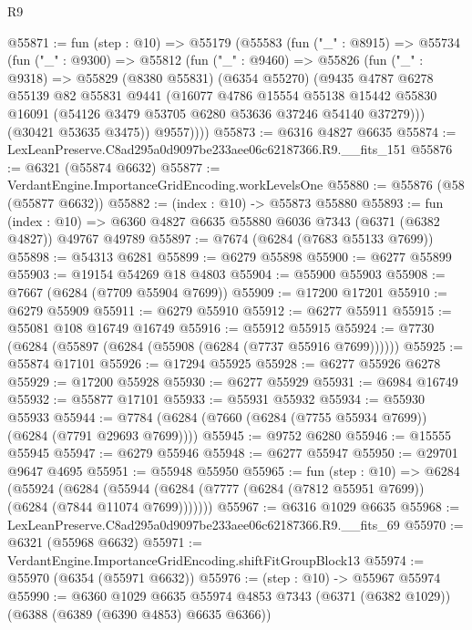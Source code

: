 \begin{lexlean}{R9}
\begin{coremodule}
@55871 := fun (step : @10) =>
  @55179
    (@55583
      (fun ("_" : @8915) =>
      @55734
        (fun ("_" : @9300) =>
        @55812
          (fun ("_" : @9460) =>
          @55826
            (fun ("_" : @9318) =>
            @55829
              (@8380 @55831)
              (@6354 @55270)
              (@9435
                @4787
                @6278
                @55139
                @82
                @55831
                @9441
                (@16077
                  @4786
                  @15554
                  @55138
                  @15442
                  @55830
                  @16091
                  (@54126 @3479 @53705 @6280 @53636 @37246 @54140 @37279)))
              (@30421 @53635 @3475))
            @9557))))
@55873 := @6316 @4827 @6635
@55874 := LexLeanPreserve.C8ad295a0d9097be233aee06c62187366.R9.__fits_151
@55876 := @6321 (@55874 @6632)
@55877 := VerdantEngine.ImportanceGridEncoding.workLevelsOne
@55880 := @55876 (@58 (@55877 @6632))
@55882 := (index : @10) -> @55873 @55880
@55893 := fun (index : @10) =>
  @6360 @4827 @6635 @55880 @6036 @7343 (@6371 (@6382 @4827)) @49767 @49789
@55897 := @7674 (@6284 (@7683 @55133 @7699))
@55898 := @54313 @6281
@55899 := @6279 @55898
@55900 := @6277 @55899
@55903 := @19154 @54269 @18 @4803
@55904 := @55900 @55903
@55908 := @7667 (@6284 (@7709 @55904 @7699))
@55909 := @17200 @17201
@55910 := @6279 @55909
@55911 := @6279 @55910
@55912 := @6277 @55911
@55915 := @55081 @108 @16749 @16749
@55916 := @55912 @55915
@55924 := @7730 (@6284 (@55897 (@6284 (@55908 (@6284 (@7737 @55916 @7699))))))
@55925 := @55874 @17101
@55926 := @17294 @55925
@55928 := @6277 @55926 @6278
@55929 := @17200 @55928
@55930 := @6277 @55929
@55931 := @6984 @16749
@55932 := @55877 @17101
@55933 := @55931 @55932
@55934 := @55930 @55933
@55944 := @7784 (@6284 (@7660 (@6284 (@7755 @55934 @7699)) (@6284 (@7791 @29693 @7699))))
@55945 := @9752 @6280
@55946 := @15555 @55945
@55947 := @6279 @55946
@55948 := @6277 @55947
@55950 := @29701 @9647 @4695
@55951 := @55948 @55950
@55965 := fun (step : @10) =>
  @6284
    (@55924
      (@6284 (@55944 (@6284 (@7777 (@6284 (@7812 @55951 @7699)) (@6284 (@7844 @11074 @7699)))))))
@55967 := @6316 @1029 @6635
@55968 := LexLeanPreserve.C8ad295a0d9097be233aee06c62187366.R9.__fits_69
@55970 := @6321 (@55968 @6632)
@55971 := VerdantEngine.ImportanceGridEncoding.shiftFitGroupBlock13
@55974 := @55970 (@6354 (@55971 @6632))
@55976 := (step : @10) -> @55967 @55974
@55990 := @6360
    @1029
    @6635
    @55974
    @4853
    @7343
    (@6371 (@6382 @1029))
    (@6388 (@6389 (@6390 @4853) @6635 @6366))

\end{coremodule}
\end{lexlean}
